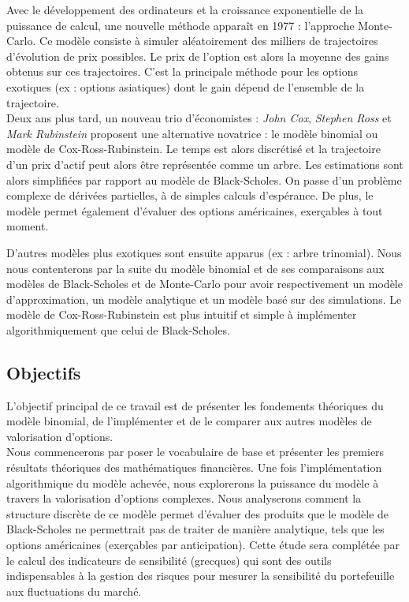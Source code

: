 \pagebreak

Avec le développement des ordinateurs et la croissance exponentielle de la puissance de calcul, une nouvelle méthode apparaît en 1977 : l'approche Monte-Carlo. Ce modèle consiste à simuler aléatoirement des milliers de trajectoires d'évolution de prix possibles. Le prix de l'option est alors la moyenne des gains obtenus sur ces trajectoires. C'est la principale méthode pour les options exotiques (ex : options asiatiques) dont le gain dépend de l'ensemble de la trajectoire. \\

Deux ans plus tard, un nouveau trio d'économistes : \textit{John Cox}, \textit{Stephen Ross} et \textit{Mark Rubinstein} proposent une alternative novatrice : le modèle binomial ou modèle de Cox-Ross-Rubinstein. Le temps est alors discrétisé et la trajectoire d'un prix d'actif peut alors être représentée comme un arbre. Les estimations sont alors simplifiées par rapport au modèle de Black-Scholes. On passe d'un problème complexe de dérivées partielles, à de simples calculs d'espérance. De plus, le modèle permet également d'évaluer des options américaines, exerçables à tout moment. \cite{OptionPricingASimplifiedApproach}

D'autres modèles plus exotiques sont ensuite apparus (ex : arbre trinomial). Nous nous contenterons par la suite du modèle binomial et de ses comparaisons aux modèles de Black-Scholes et de Monte-Carlo pour avoir respectivement un modèle d'approximation, un modèle analytique et un modèle basé sur des simulations. Le modèle de Cox-Ross-Rubinstein est plus intuitif et simple à implémenter algorithmiquement que celui de Black-Scholes. \\

\subsection{Objectifs}

L'objectif principal de ce travail est de présenter les fondements théoriques du modèle binomial, de l'implémenter et de le comparer aux autres modèles de valorisation d'options. \\

Nous commencerons par poser le vocabulaire de base et présenter les premiers résultats théoriques des mathématiques financières. Une fois l'implémentation algorithmique du modèle achevée, nous explorerons la puissance du modèle à travers la valorisation d'options complexes. Nous analyserons comment la structure discrète de ce modèle permet d'évaluer des produits que le modèle de Black-Scholes ne permettrait pas de traiter de manière analytique, tels que les options américaines (exerçables par anticipation). Cette étude sera complétée par le calcul des indicateurs de sensibilité (grecques) qui sont des outils indispensables à la gestion des risques pour mesurer la sensibilité du portefeuille aux fluctuations du marché. \\

